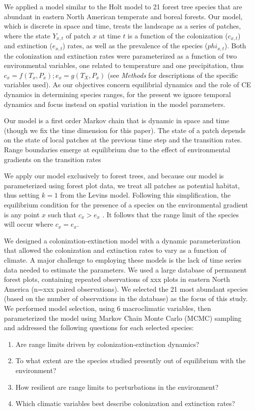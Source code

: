 \documentclass[11pt]{article}
\begin{document}
We applied a model similar to the Holt model \cite{Holt2000} to 21 forest tree species that are abundant in eastern North American temperate and boreal forests.
Our model, which is discrete in space and time, treats the landscape as a series of patches, where the state $Y_{x,t}$ of patch $x$ at time $t$ is a function of the colonization ($c_{x,t}$) and extinction ($e_{x,t}$) rates, as well as the prevalence of the species ($phi_{x,t}$).
Both the colonization and extinction rates were parameterized as a function of two environmental variables, one related to temperature and one precipitation, thus $c_x = f(T_x, P_x); e_x = g(T_X, P_x)$ (see \emph{Methods} for descriptions of the specific variables used).
As our objectives concern equilibrial dynamics and the role of CE dynamics in determining species ranges, for the present we ignore temporal dynamics and focus instead on spatial variation in the model parameters.

Our model is a first order Markov chain that is dynamic in space and time (though we fix the time dimension for this paper). The state of a patch depends on the state of local patches at the previous time step and the transition rates. Range boundaries emerge at equilibrium due to the effect of environmental gradients on the transition rates

We apply our model exclusively to forest trees, and because our model is parameterized using forest plot data, we treat all patches as potential habitat, thus setting $k=1$ from the Levins model.
Following this simplification, the equilibrium condition for the presence of a species on the environmental gradient is any point $x$ such that $c_x > e_x$ \cite{Holt2000}.
It follows that the range limit of the species will occur where $c_x = e_x$.


We designed a colonization-extinction model with a dynamic parameterization that allowed the colonization and extinction rates to vary as a function of climate.
A major challenge to employing these models is the lack of time series data needed to estimate the parameters.
We used a large database of permanent forest plots, containing repeated observations of xxx plots in eastern North America (n=xxx paired observations). 
We selected the 21 most abundant species (based on the number of observations in the database) as the focus of this study.
We performed model selection, using 6 macroclimatic variables, then parameterized the model using Markov Chain Monte Carlo (MCMC) sampling and addressed the following questions for each selected species:
\begin{enumerate}
	\item Are range limits driven by colonization-extinction dynamics?
	\item To what extent are the species studied presently out of equilibrium with the environment?
	\item How resilient are range limits to perturbations in the environment?
	\item Which climatic variables best describe colonization and extinction rates?
\end{enumerate}
\end{document}
